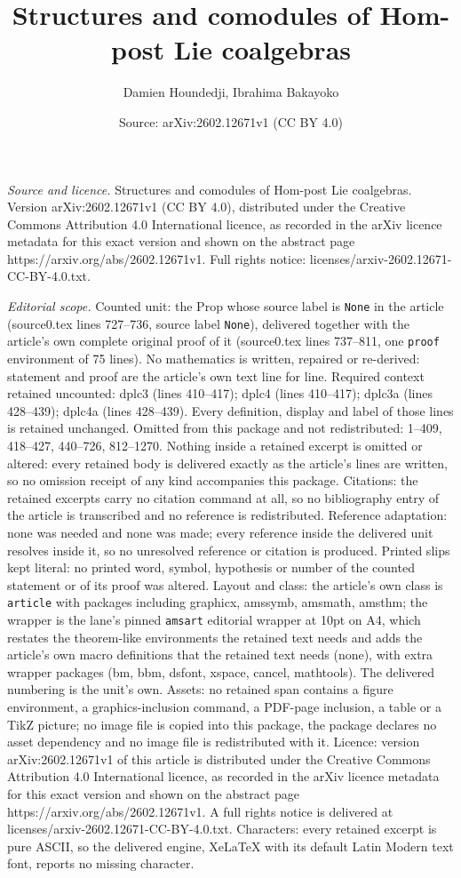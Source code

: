 \documentclass[10pt,a4paper]{amsart}
\title[Structures and comodules of Hom-post Lie coalgebras]{Structures and comodules of Hom-post Lie coalgebras}
\author{Damien Houndedji, Ibrahima Bakayoko}
\date{Source: arXiv:2602.12671v1 (CC BY 4.0)}
\begin{document}
\maketitle

\noindent\emph{Source and licence.} Structures and comodules of Hom-post Lie coalgebras. Version arXiv:2602.12671v1 (CC BY 4.0), distributed under the Creative Commons Attribution 4.0 International licence, as recorded in the arXiv licence metadata for this exact version and shown on the abstract page https://arxiv.org/abs/2602.12671v1. Full rights notice: licenses/arxiv-2602.12671-CC-BY-4.0.txt.\par\smallskip

\noindent\textit{Editorial scope.} Counted unit: the Prop whose source label is \texttt{None} in the article (source0.tex lines 727--736, source label \texttt{None}), delivered together with the article's own complete original proof of it (source0.tex lines 737--811, one \texttt{proof} environment of 75 lines). No mathematics is written, repaired or re-derived: statement and proof are the article's own text line for line. Required context retained uncounted: dplc3 (lines 410--417); dplc4 (lines 410--417); dplc3a (lines 428--439); dplc4a (lines 428--439). Every definition, display and label of those lines is retained unchanged. Omitted from this package and not redistributed: 1--409, 418--427, 440--726, 812--1270. Nothing inside a retained excerpt is omitted or altered: every retained body is delivered exactly as the article's lines are written, so no omission receipt of any kind accompanies this package. Citations: the retained excerpts carry no citation command at all, so no bibliography entry of the article is transcribed and no reference is redistributed. Reference adaptation: none was needed and none was made; every reference inside the delivered unit resolves inside it, so no unresolved reference or citation is produced. Printed slips kept literal: no printed word, symbol, hypothesis or number of the counted statement or of its proof was altered. Layout and class: the article's own class is \texttt{article} with packages including graphicx, amssymb, amsmath, amsthm; the wrapper is the lane's pinned \texttt{amsart} editorial wrapper at 10pt on A4, which restates the theorem-like environments the retained text needs and adds the article's own macro definitions that the retained text needs (none), with extra wrapper packages (bm, bbm, dsfont, xspace, cancel, mathtools). The delivered numbering is the unit's own. Assets: no retained span contains a figure environment, a graphics-inclusion command, a PDF-page inclusion, a table or a TikZ picture; no image file is copied into this package, the package declares no asset dependency and no image file is redistributed with it. Licence: version arXiv:2602.12671v1 of this article is distributed under the Creative Commons Attribution 4.0 International licence, as recorded in the arXiv licence metadata for this exact version and shown on the abstract page https://arxiv.org/abs/2602.12671v1. A full rights notice is delivered at licenses/arxiv-2602.12671-CC-BY-4.0.txt. Characters: every retained excerpt is pure ASCII, so the delivered engine, XeLaTeX with its default Latin Modern text font, reports no missing character.
\end{document}
